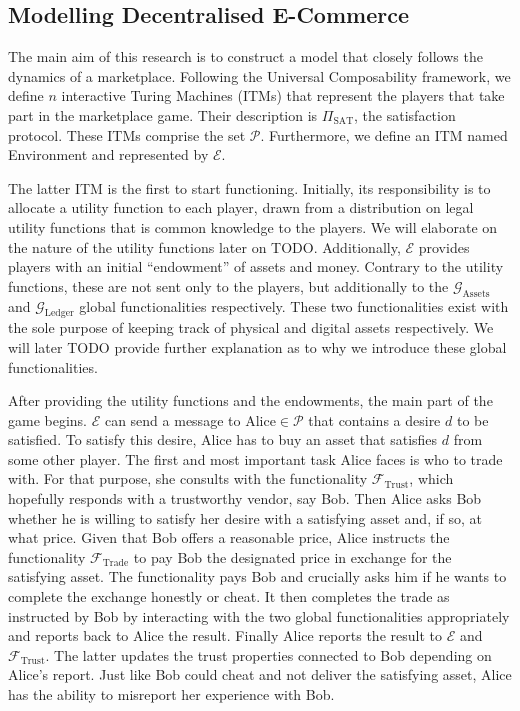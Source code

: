 \subsection{Modelling Decentralised E-Commerce}
  The main aim of this research is to construct a model that closely follows the dynamics
  of a marketplace. Following the Universal Composability framework, we define $n$
  interactive Turing Machines (ITMs) that represent the players that take part in the
  marketplace game. Their description is $\Pi_{\mathrm{SAT}}$, the satisfaction protocol.
  These ITMs comprise the set $\mathcal{P}$. Furthermore, we define an ITM named
  Environment and represented by $\mathcal{E}$.

  The latter ITM is the first to start functioning. Initially, its responsibility is to
  allocate a utility function to each player, drawn from a distribution on legal utility
  functions that is common knowledge \cite{knowledge} to the players. We will elaborate on
  the nature of the utility functions later on TODO. Additionally, $\mathcal{E}$ provides
  players with an initial ``endowment'' of assets and money. Contrary to the utility
  functions, these are not sent only to the players, but additionally to the
  $\mathcal{G}_{\mathrm{Assets}}$ and $\mathcal{G}_{\mathrm{Ledger}}$ global
  functionalities respectively. These two functionalities exist with the sole purpose of
  keeping track of physical and digital assets respectively. We will later TODO provide
  further explanation as to why we introduce these global functionalities.

  After providing the utility functions and the endowments, the main part of the game
  begins. $\mathcal{E}$ can send a message to $\mathrm{Alice} \in \mathcal{P}$ that
  contains a desire $d$ to be satisfied. To satisfy this desire, Alice has to buy an asset
  that satisfies $d$ from some other player. The first and most important task Alice faces
  is who to trade with. For that purpose, she consults with the functionality
  $\mathcal{F}_{\mathrm{Trust}}$, which hopefully responds with a trustworthy vendor, say
  Bob. Then Alice asks Bob whether he is willing to satisfy her desire with a satisfying
  asset and, if so, at what price. Given that Bob offers a reasonable price, Alice
  instructs the functionality $\mathcal{F}_{\mathrm{Trade}}$ to pay Bob the designated
  price in exchange for the satisfying asset. The functionality pays Bob and crucially
  asks him if he wants to complete the exchange honestly or cheat. It then completes the
  trade as instructed by Bob by interacting with the two global functionalities
  appropriately and reports back to Alice the result. Finally Alice reports the result to
  $\mathcal{E}$ and $\mathcal{F}_{\mathrm{Trust}}$. The latter updates the trust
  properties connected to Bob depending on Alice's report. Just like Bob could cheat and
  not deliver the satisfying asset, Alice has the ability to misreport her experience with
  Bob.

